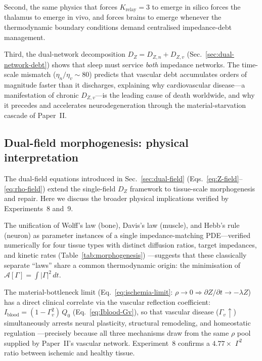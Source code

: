 ﻿\documentclass[aps,pre,twocolumn,superscriptaddress,floatfix]{revtex4-2}
\begin{document}
Second, the same physics that forces $K_{\mathrm{relay}}=3$
to emerge in silico forces the thalamus to emerge
in vivo, and forces brains to emerge
whenever the thermodynamic boundary conditions
demand centralised impedance-debt management.

Third, the dual-network decomposition $D_Z = D_{Z,n} + D_{Z,v}$
(Sec.~\ref{sec:dual-network-debt}) shows that sleep must
service \emph{both} impedance networks.
The time-scale mismatch ($\eta_n / \eta_v \sim 80$) predicts
that vascular debt accumulates orders of magnitude faster
than it discharges, explaining why cardiovascular disease---a
manifestation of chronic $D_{Z,v}$---is the leading cause
of death worldwide, and why it precedes and accelerates
neurodegeneration through the material-starvation cascade
of Paper~II.

\subsection{Dual-field morphogenesis: physical interpretation}
\label{sec:material-bottleneck}

The dual-field equations introduced in Sec.~\ref{sec:dual-field}
(Eqs.~\eqref{eq:Z-field}--\eqref{eq:rho-field})
extend the single-field $D_Z$ framework to tissue-scale
morphogenesis and repair.
Here we discuss the broader physical implications verified
by Experiments~8 and~9.

The unification of Wolff's law (bone), Davis's law (muscle),
and Hebb's rule (neuron) as parameter instances of a
single impedance-matching PDE---verified numerically for
four tissue types with distinct diffusion ratios, target
impedances, and kinetic rates (Table~\ref{tab:morphogenesis})
---suggests that these classically separate ``laws'' share
a common thermodynamic origin: the minimisation of
$\mathcal{A}[\Gamma] = \int |\Gamma|^2\,dt$.

The material-bottleneck limit
(Eq.~\eqref{eq:ischemia-limit}: $\rho \to 0 \Rightarrow
\partial Z/\partial t \to -\lambda Z$)
has a direct clinical correlate via the vascular reflection
coefficient: $I_{\mathrm{blood}} = (1-\Gamma_v^2)\,Q_0$
(Eq.~\eqref{eq:Iblood-Gv}), so that vascular disease
($\Gamma_v\!\uparrow$) simultaneously arrests neural
plasticity, structural remodeling, and homeostatic regulation
---precisely because all three mechanisms draw from the
same $\rho$ pool supplied by Paper~II's vascular network.
Experiment~8 confirms a $4.77\times$ $\Gamma^2$ ratio
between ischemic and healthy tissue.
\end{document}
